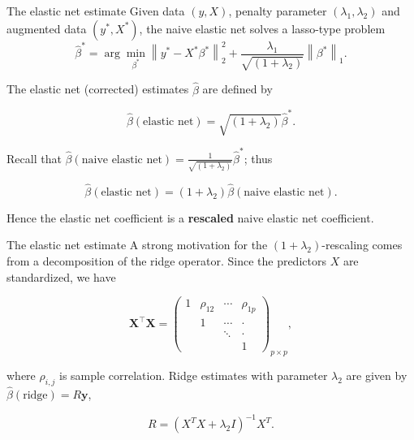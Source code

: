     \begin{frame}{The elastic net estimate}
         Given data \( (y, X) \), penalty parameter \( (\lambda_1, \lambda_2) \) and augmented data \( (y^*, X^*) \), the naive elastic net solves a lasso-type problem
\begin{equation}
   \hat{\beta}^* = \arg\min_{\beta^*} \left\| y^* - X^* \beta^* \right\|_2^2 + \frac{\lambda_1}{\sqrt{(1 + \lambda_2)}} \left\| \beta^* \right\|_1. 
\end{equation}

The elastic net (corrected) estimates \( \hat{\beta} \) are defined by

\begin{equation}
    \hat{\beta}(\text{elastic net}) = \sqrt{(1 + \lambda_2)} \hat{\beta}^*.
\end{equation}


Recall that \( \hat{\beta}(\text{naive elastic net}) = \frac{1}{\sqrt{(1 + \lambda_2)}} \hat{\beta}^* \); thus

\begin{equation}
  \hat{\beta}(\text{elastic net}) = (1 + \lambda_2) \hat{\beta}(\text{naive elastic net}).   
\end{equation}

Hence the elastic net coefficient is a \textbf{rescaled} naive elastic net coefficient.
    \end{frame}

\begin{frame}{The elastic net estimate}
    A strong motivation for the \( (1 + \lambda_2) \)-rescaling comes from a decomposition of the ridge operator. Since the predictors \( X \) are standardized, we have

$$
\mathbf{X}^\top\mathbf{X} = \begin{pmatrix}
1 & \rho_{12} & \cdots & \rho_{1p} \\
 & 1 & \cdots & \cdot \\
 &  & \ddots & \cdot \\
 &  &  & 1
\end{pmatrix}_{p \times p},
$$

where \( \rho_{i,j} \) is sample correlation. Ridge estimates with parameter \( \lambda_2 \) are given by \( \hat{\beta}(\text{ridge}) = R\boldsymbol{y} \),

$$
R = (X^TX + \lambda_2I)^{-1}X^T.
$$



\end{frame}

